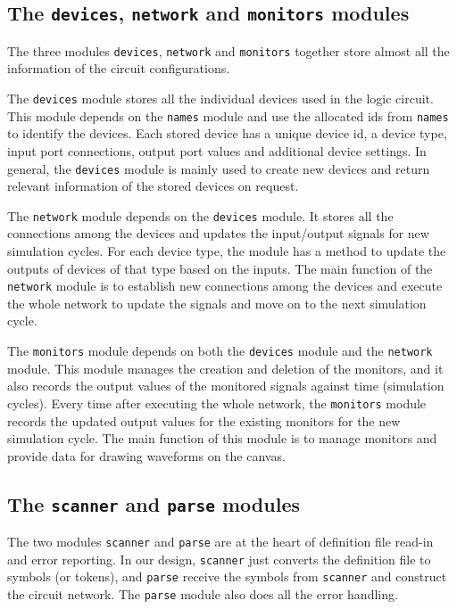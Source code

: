 \documentclass[10pt,a4paper]{article}
\begin{document}
\subsection{The \texttt{devices}, \texttt{network} and \texttt{monitors} modules}
\label{sec:orgd0a43aa}

The three modules \texttt{devices}, \texttt{network} and \texttt{monitors} together store
almost all the information of the circuit configurations.

The \texttt{devices} module stores all the individual devices used in the
logic circuit. This module depends on the \texttt{names} module and use the
allocated ids from \texttt{names} to identify the devices. Each stored device
has a unique device id, a device type, input port connections, output
port values and additional device settings. In general, the \texttt{devices}
module is mainly used to create new devices and return relevant
information of the stored devices on request.

The \texttt{network} module depends on the \texttt{devices} module. It stores all
the connections among the devices and updates the input/output
signals for new simulation cycles. For each device type, the module
has a method to update the outputs of devices of that type based on
the inputs. The main function of the \texttt{network} module is to establish
new connections among the devices and execute the whole network to
update the signals and move on to the next simulation cycle.

The \texttt{monitors} module depends on both the \texttt{devices} module and the
\texttt{network} module. This module manages the creation and deletion of the
monitors, and it also records the output values of the monitored
signals against time (simulation cycles). Every time after executing
the whole network, the \texttt{monitors} module records the updated output
values for the existing monitors for the new simulation cycle. The
main function of this module is to manage monitors and provide data
for drawing waveforms on the canvas.

\subsection{The \texttt{scanner} and \texttt{parse} modules}
\label{sec:orgb071fc8}

The two modules \texttt{scanner} and \texttt{parse} are at the heart of definition
file read-in and error reporting. In our design, \texttt{scanner} just
converts the definition file to symbols (or tokens), and \texttt{parse}
receive the symbols from \texttt{scanner} and construct the circuit network.
The \texttt{parse} module also does all the error handling.
\end{document}
